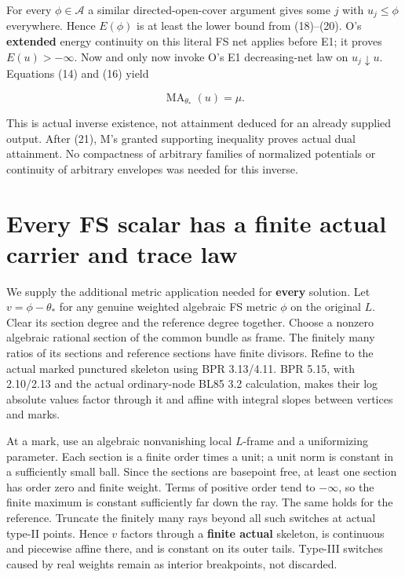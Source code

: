 \documentclass[
  11pt,
]{article}
\begin{document}
For every \(\phi\in\mathcal A\) a similar directed-open-cover argument
gives some \(j\) with \(u_j\leq\phi\) everywhere. Hence \(E(\phi)\) is
at least the lower bound from (18)--(20). O's \textbf{extended} energy
continuity on this literal FS net applies before E1; it proves
\(E(u)>-\infty\). Now and only now invoke O's E1 decreasing-net law on
\(u_j\downarrow u\). Equations (14) and (16) yield

\[
                     \operatorname{MA}_{\theta_*}(u)=\mu.         \tag{21}
\]

This is actual inverse existence, not attainment deduced for an already
supplied output. After (21), M's granted supporting inequality proves
actual dual attainment. No compactness of arbitrary families of
normalized potentials or continuity of arbitrary envelopes was needed
for this inverse.

\section{Every FS scalar has a finite actual carrier and trace
law}\label{every-fs-scalar-has-a-finite-actual-carrier-and-trace-law}

We supply the additional metric application needed for \textbf{every}
solution. Let \(v=\phi-\theta_*\) for any genuine weighted algebraic FS
metric \(\phi\) on the original \(L\). Clear its section degree and the
reference degree together. Choose a nonzero algebraic rational section
of the common bundle as frame. The finitely many ratios of its sections
and reference sections have finite divisors. Refine to the actual marked
punctured skeleton using BPR 3.13/4.11. BPR 5.15, with 2.10/2.13 and the
actual ordinary-node BL85 3.2 calculation, makes their log absolute
values factor through it and affine with integral slopes between
vertices and marks.

At a mark, use an algebraic nonvanishing local \(L\)-frame and a
uniformizing parameter. Each section is a finite order times a unit; a
unit norm is constant in a sufficiently small ball. Since the sections
are basepoint free, at least one section has order zero and finite
weight. Terms of positive order tend to \(-\infty\), so the finite
maximum is constant sufficiently far down the ray. The same holds for
the reference. Truncate the finitely many rays beyond all such switches
at actual type-II points. Hence \(v\) factors through a \textbf{finite
actual} skeleton, is continuous and piecewise affine there, and is
constant on its outer tails. Type-III switches caused by real weights
remain as interior breakpoints, not discarded.
\end{document}
